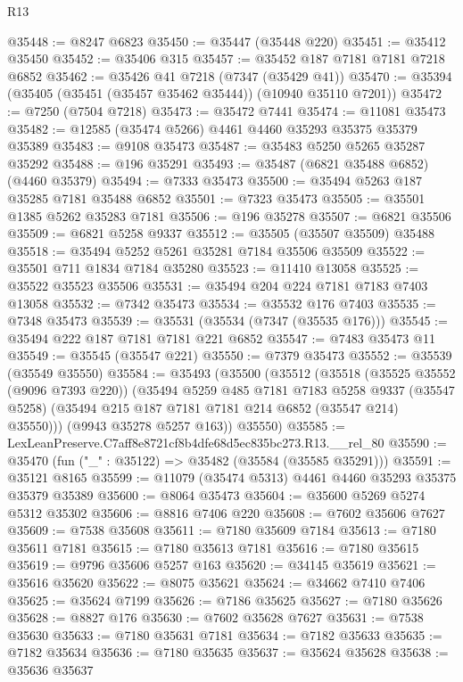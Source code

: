 \begin{lexlean}{R13}
\begin{coremodule}
@35448 := @8247 @6823
@35450 := @35447 (@35448 @220)
@35451 := @35412 @35450
@35452 := @35406 @315
@35457 := @35452 @187 @7181 @7181 @7218 @6852
@35462 := @35426 @41 @7218 (@7347 (@35429 @41))
@35470 := @35394 (@35405 (@35451 (@35457 @35462 @35444)) (@10940 @35110 @7201))
@35472 := @7250 (@7504 @7218)
@35473 := @35472 @7441
@35474 := @11081 @35473
@35482 := @12585 (@35474 @5266) @4461 @4460 @35293 @35375 @35379 @35389
@35483 := @9108 @35473
@35487 := @35483 @5250 @5265 @35287 @35292
@35488 := @196 @35291
@35493 := @35487 (@6821 @35488 @6852) (@4460 @35379)
@35494 := @7333 @35473
@35500 := @35494 @5263 @187 @35285 @7181 @35488 @6852
@35501 := @7323 @35473
@35505 := @35501 @1385 @5262 @35283 @7181
@35506 := @196 @35278
@35507 := @6821 @35506
@35509 := @6821 @5258 @9337
@35512 := @35505 (@35507 @35509) @35488
@35518 := @35494 @5252 @5261 @35281 @7184 @35506 @35509
@35522 := @35501 @711 @1834 @7184 @35280
@35523 := @11410 @13058
@35525 := @35522 @35523 @35506
@35531 := @35494 @204 @224 @7181 @7183 @7403 @13058
@35532 := @7342 @35473
@35534 := @35532 @176 @7403
@35535 := @7348 @35473
@35539 := @35531 (@35534 (@7347 (@35535 @176)))
@35545 := @35494 @222 @187 @7181 @7181 @221 @6852
@35547 := @7483 @35473 @11
@35549 := @35545 (@35547 @221)
@35550 := @7379 @35473
@35552 := @35539 (@35549 @35550)
@35584 := @35493
    (@35500
      (@35512
        (@35518
          (@35525 @35552 (@9096 @7393 @220))
          (@35494
            @5259
            @485
            @7181
            @7183
            @5258
            @9337
            (@35547 @5258)
            (@35494 @215 @187 @7181 @7181 @214 @6852 (@35547 @214) @35550)))
        (@9943 @35278 @5257 @163))
      @35550)
@35585 := LexLeanPreserve.C7aff8e8721cf8b4dfe68d5ec835bc273.R13.__rel_80
@35590 := @35470 (fun ("_" : @35122) => @35482 (@35584 (@35585 @35291)))
@35591 := @35121 @8165
@35599 := @11079 (@35474 @5313) @4461 @4460 @35293 @35375 @35379 @35389
@35600 := @8064 @35473
@35604 := @35600 @5269 @5274 @5312 @35302
@35606 := @8816 @7406 @220
@35608 := @7602 @35606 @7627
@35609 := @7538 @35608
@35611 := @7180 @35609 @7184
@35613 := @7180 @35611 @7181
@35615 := @7180 @35613 @7181
@35616 := @7180 @35615
@35619 := @9796 @35606 @5257 @163
@35620 := @34145 @35619
@35621 := @35616 @35620
@35622 := @8075 @35621
@35624 := @34662 @7410 @7406
@35625 := @35624 @7199
@35626 := @7186 @35625
@35627 := @7180 @35626
@35628 := @8827 @176
@35630 := @7602 @35628 @7627
@35631 := @7538 @35630
@35633 := @7180 @35631 @7181
@35634 := @7182 @35633
@35635 := @7182 @35634
@35636 := @7180 @35635
@35637 := @35624 @35628
@35638 := @35636 @35637

\end{coremodule}
\end{lexlean}
